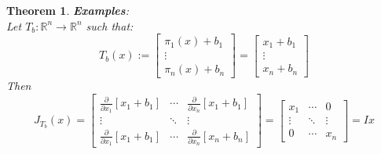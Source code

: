 \documentclass[12pt]{extarticle}
\theoremstyle{plain}
\newtheorem{thm}{Theorem}[section]
\theoremstyle{Definition}
\theoremstyle{Definition}
\theoremstyle{plain}
\begin{document}
\begin{thm} \textbf{Examples}: \\ 
	Let $T_b : \mathbb{R}^n \to \mathbb{R}^n$ such that:
	\[
	T_b(x) := 
	\begin{bmatrix}
	\pi_1(x) + b_1 \\ 
	\vdots \\ 
	\pi_n(x) + b_n
	\end{bmatrix}
	= 
	\begin{bmatrix}
	x_1 + b_1 \\ 
	\vdots \\ 
	x_n + b_n
	\end{bmatrix}
	\]
	Then
	\[
		J_{T_b}(x) = 
		\begin{bmatrix} 
		\frac{\partial }{\partial x_1}[x_1 + b_1] & \cdots & \frac{\partial }{\partial x_n}[x_1 + b_1] \\
		\vdots & \ddots & \vdots \\ 
		\frac{\partial }{\partial x_1}[x_1 + b_1] & \cdots & \frac{\partial }{\partial x_n}[x_n + b_n] 
		\end{bmatrix}
		=
		\begin{bmatrix} 
		x_1 & \cdots & 0 \\
		\vdots & \ddots & \vdots \\ 
		0 & \cdots & x_n
		\end{bmatrix}
		= Ix
	\]
\end{thm}
\end{document}
